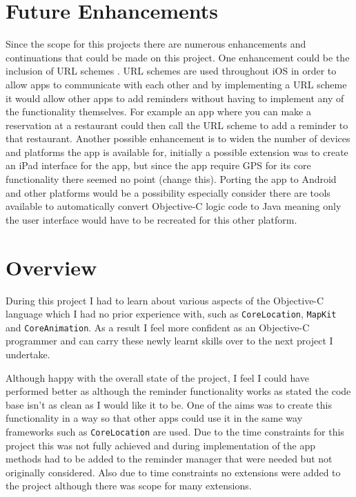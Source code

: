 \documentclass[12pt]{report}
\begin{document}
\section{Future Enhancements}

Since the scope for this projects there are numerous enhancements and continuations that could be made on this project. One enhancement could be the inclusion of URL schemes \cite{urlscheme}. URL schemes are used throughout iOS in order to allow apps to communicate with each other and by implementing a URL scheme it would allow other apps to add reminders without having to implement any of the functionality themselves. For example an app where you can make a reservation at a restaurant could then call the URL scheme to add a reminder to that restaurant. Another possible enhancement is to widen the number of devices and platforms the app is available for, initially a possible extension was to create an iPad interface for the app, but since the app require GPS for its core functionality there seemed no point (change this). Porting the app to Android and other platforms would be a possibility especially consider there are tools available to automatically convert Objective-C logic code to Java \cite{objc2j} meaning only the user interface would have to be recreated for this other platform.

\section{Overview}

During this project I had to learn about various aspects of the Objective-C language which I had no prior experience with, such as \texttt{CoreLocation}, \texttt{MapKit} and \texttt{CoreAnimation}. As a result I feel more confident as an Objective-C programmer and can carry these newly learnt skills over to the next project I undertake. 

Although happy with the overall state of the project, I feel I could have performed better as although the reminder functionality works as stated the code base isn't as clean as I would like it to be. One of the aims was to create this functionality in a way so that other apps could use it in the same way frameworks such as \texttt{CoreLocation} are used. Due to the time constraints for this project this was not fully achieved and during implementation of the app methods had to be added to the reminder manager that were needed but not originally considered. Also due to time constraints no extensions were added to the project although there was scope for many extensions.\\
\end{document}
